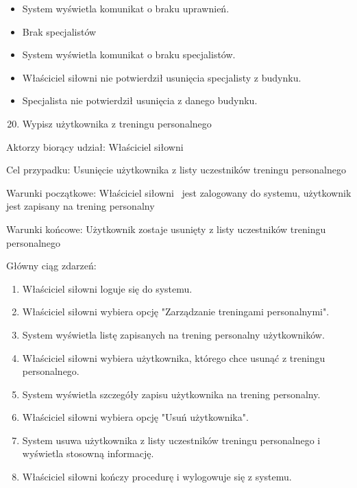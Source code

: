 \documentclass[
]{article}
\providecommand{\tightlist}{%
  \setlength{\itemsep}{0pt}\setlength{\parskip}{0pt}}
\begin{document}
\begin{itemize}
\tightlist
\item
  {System wyświetla komunikat o braku uprawnień.}
\end{itemize}

\begin{itemize}
\tightlist
\item
  {Brak specjalistów}
\end{itemize}

\begin{itemize}
\tightlist
\item
  {System wyświetla komunikat o braku specjalistów.}
\end{itemize}

\begin{itemize}
\tightlist
\item
  {Właściciel siłowni nie potwierdził usunięcia specjalisty z budynku.}
\item
  {Specjalista nie potwierdził usunięcia z danego budynku.\\
  }
\end{itemize}

{}

{}

{}

\begin{enumerate}
\setcounter{enumi}{19}
\tightlist
\item
  {Wypisz użytkownika z treningu personalnego}
\end{enumerate}

{Aktorzy biorący udział: Właściciel siłowni}

{Cel przypadku: Usunięcie użytkownika z listy uczestników treningu
personalnego}

{Warunki początkowe: Właściciel siłowni ~jest zalogowany do systemu,
użytkownik jest zapisany na trening personalny}

{Warunki końcowe: Użytkownik zostaje usunięty z listy uczestników
treningu personalnego}

{Główny ciąg zdarzeń:}

\begin{enumerate}
\tightlist
\item
  {Właściciel siłowni loguje się do systemu.}
\item
  {Właściciel siłowni wybiera opcję "Zarządzanie treningami
  personalnymi".}
\item
  {System wyświetla listę zapisanych na trening personalny
  użytkowników.}
\item
  {Właściciel siłowni wybiera użytkownika, którego chce usunąć z
  treningu personalnego.}
\item
  {System wyświetla szczegóły zapisu użytkownika na trening personalny.}
\item
  {Właściciel siłowni wybiera opcję "Usuń użytkownika".}
\item
  {System usuwa użytkownika z listy uczestników treningu personalnego i
  wyświetla stosowną informację.}
\item
  {Właściciel siłowni kończy procedurę i wylogowuje się z systemu.}
\end{enumerate}
\end{document}
